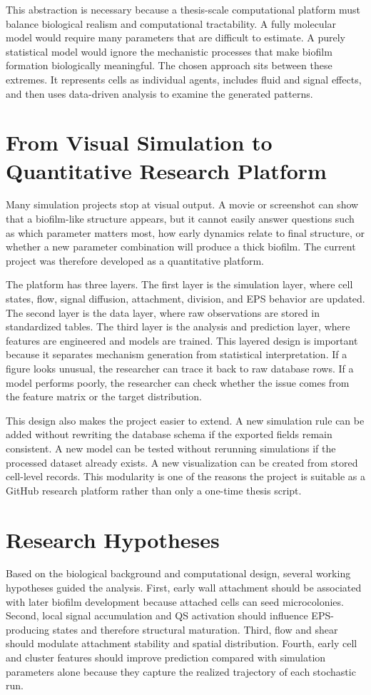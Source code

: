\documentclass[12pt,a4paper,oneside]{report}
\begin{document}
This abstraction is necessary because a thesis-scale computational platform must balance biological realism and computational tractability. A fully molecular model would require many parameters that are difficult to estimate. A purely statistical model would ignore the mechanistic processes that make biofilm formation biologically meaningful. The chosen approach sits between these extremes. It represents cells as individual agents, includes fluid and signal effects, and then uses data-driven analysis to examine the generated patterns.

\section{From Visual Simulation to Quantitative Research Platform}
Many simulation projects stop at visual output. A movie or screenshot can show that a biofilm-like structure appears, but it cannot easily answer questions such as which parameter matters most, how early dynamics relate to final structure, or whether a new parameter combination will produce a thick biofilm. The current project was therefore developed as a quantitative platform.

The platform has three layers. The first layer is the simulation layer, where cell states, flow, signal diffusion, attachment, division, and EPS behavior are updated. The second layer is the data layer, where raw observations are stored in standardized tables. The third layer is the analysis and prediction layer, where features are engineered and models are trained. This layered design is important because it separates mechanism generation from statistical interpretation. If a figure looks unusual, the researcher can trace it back to raw database rows. If a model performs poorly, the researcher can check whether the issue comes from the feature matrix or the target distribution.

This design also makes the project easier to extend. A new simulation rule can be added without rewriting the database schema if the exported fields remain consistent. A new model can be tested without rerunning simulations if the processed dataset already exists. A new visualization can be created from stored cell-level records. This modularity is one of the reasons the project is suitable as a GitHub research platform rather than only a one-time thesis script.

\section{Research Hypotheses}
Based on the biological background and computational design, several working hypotheses guided the analysis. First, early wall attachment should be associated with later biofilm development because attached cells can seed microcolonies. Second, local signal accumulation and QS activation should influence EPS-producing states and therefore structural maturation. Third, flow and shear should modulate attachment stability and spatial distribution. Fourth, early cell and cluster features should improve prediction compared with simulation parameters alone because they capture the realized trajectory of each stochastic run.
\end{document}
